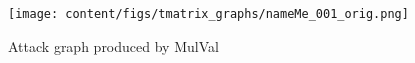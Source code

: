 
\begin{figure}[ht]
    \centering
    \texttt{[image: content/figs/tmatrix\_graphs/nameMe\_001\_orig.png]} 
    \caption{Attack graph produced by MulVal} 
    \label{fig:tg_001}
\end{figure}